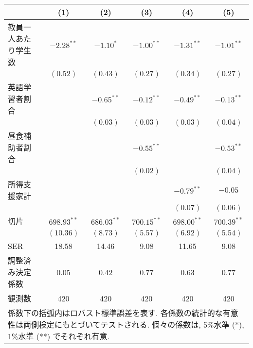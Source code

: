 
\begin{tabular}{l c c c c c }
\hline
 & (1) & (2) & (3) & (4) & (5) \\
\hline
教員一人あたり学生数 & $-2.28^{**}$  & $-1.10^{*}$   & $-1.00^{**}$  & $-1.31^{**}$  & $-1.01^{**}$  \\
           & $(0.52)$      & $(0.43)$      & $(0.27)$      & $(0.34)$      & $(0.27)$      \\
英語学習者割合    &               & $-0.65^{**}$  & $-0.12^{**}$  & $-0.49^{**}$  & $-0.13^{**}$  \\
           &               & $(0.03)$      & $(0.03)$      & $(0.03)$      & $(0.04)$      \\
昼食補助者割合    &               &               & $-0.55^{**}$  &               & $-0.53^{**}$  \\
           &               &               & $(0.02)$      &               & $(0.04)$      \\
所得支援家計     &               &               &               & $-0.79^{**}$  & $-0.05$       \\
           &               &               &               & $(0.07)$      & $(0.06)$      \\
切片         & $698.93^{**}$ & $686.03^{**}$ & $700.15^{**}$ & $698.00^{**}$ & $700.39^{**}$ \\
           & $(10.36)$     & $(8.73)$      & $(5.57)$      & $(6.92)$      & $(5.54)$      \\
\hline
SER        & 18.58         & 14.46         & 9.08          & 11.65         & 9.08          \\
調整済み決定係数   & 0.05          & 0.42          & 0.77          & 0.63          & 0.77          \\
観測数        & 420           & 420           & 420           & 420           & 420           \\
\hline
\multicolumn{6}{l}{\scriptsize{係数下の括弧内はロバスト標準誤差を表す. 各係数の統計的な有意性は両側検定にもとづいてテストされる. 個々の係数は, 5\%水準 (*), 1\%水準 (**) でそれぞれ有意.}}
\end{tabular}
